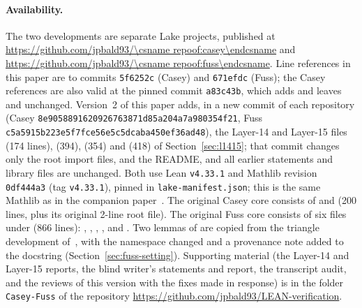 \documentclass[11pt]{article}
\theoremstyle{definition}
\theoremstyle{remark}
\newcommand{\repo}[1]{https://github.com/jpbald93/\csname repoof:#1\endcsname}
\begin{document}
\paragraph{Availability.}
{\sloppy The two developments are separate Lake projects, published at
\url{\repo{casey}} and \url{\repo{fuss}}.
Line references in this paper are to commits \texttt{5f6252c} (Casey) and
\texttt{671efdc} (Fuss); the Casey references are also valid at the pinned commit \texttt{a83c43b},
which adds  and leaves  and  unchanged.
Version~2 of this paper adds, in a new commit of each repository (Casey \texttt{8e9058891620926763871d85a204a7a980354f21}, Fuss
\texttt{c5a5915b223e5f7fce56e5c5dcaba450ef36ad48}), the Layer-14 and Layer-15 files  (174 lines),
 (394),  (354) and 
(418) of Section~\ref{sec:l1415}; that commit changes only the root import files,  and the
README, and all earlier statements and library files are unchanged. Both use Lean \texttt{v4.33.1} and Mathlib revision
\texttt{0df444a3} (tag \texttt{v4.33.1}), pinned in \texttt{lake-manifest.json}; this is the same
Mathlib as in the companion paper~\cite{BaldTriangles}. The original Casey core consists of
 and  (200 lines, plus its original 2-line root file). The original Fuss core consists of six
files under  (866 lines): , , ,
,  and . Two lemmas of
 are copied from the triangle development 
of~\cite{BaldTriangles}, with the namespace changed and a provenance note added to the
docstring (Section~\ref{sec:fuss-setting}). Supporting material (the Layer-14 and Layer-15 reports, the blind writer's statements and report, the transcript audit, and the reviews of this version with the fixes made in response) is in the folder \texttt{Casey-Fuss} of the repository \url{https://github.com/jpbald93/LEAN-verification}.\par}
\end{document}
